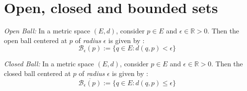 \section{Open, closed and bounded sets}
\begin{Definition}{\emph{Open Ball:}}\label{def:open_ball}
    In a metric space $(E,d)$, consider $p \in E$ and $\epsilon \in \mathbb{R} > 0$. Then the
    open ball centered at $p$ of \emph{radius} $\epsilon$ is given by :
    \begin{displaymath}
	\mathcal{B}_{\epsilon}(p) := \left.\lbrace q \in E : d(q,p) < \epsilon \rbrace\right.
    \end{displaymath}
\end{Definition}

\begin{Definition}{\emph{Closed Ball:}}\label{def:closed_ball}
    In a metric space $(E,d)$, consider $p \in E$ and $\epsilon \in \mathbb{R} > 0$. Then the
    closed ball centered at $p$ of \emph{radius} $\epsilon$ is given by :
    \begin{displaymath}
	\overline{\mathcal{B}_{\epsilon}(p)} := \left.\lbrace q \in E : d(q,p) \leq \epsilon 
	    \rbrace\right.
    \end{displaymath}
\end{Definition}

